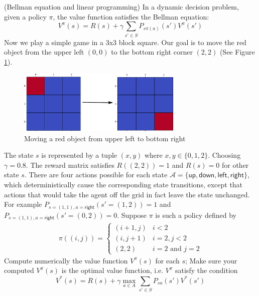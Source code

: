 \documentclass[a4paper,12pt, answers]{exam} %
\begin{document}
\begin{questions}






\question[2] (Bellman equation and linear programming)
In a dynamic decision problem, given a policy $\pi$, the value function
satisfies the Bellman equation:
\begin{equation}\label{eq:bellman}
    V^{\pi}(s)
= R(s) + \gamma
\sum_{s' \in S}
P_{s\pi(a)}(s')V^{\pi}(s')
\end{equation}
Now we play a simple game in a 3x3 block square. Our goal is to move the red object from
the upper left $(0, 0)$ to the bottom right corner $(2,2)$ (See Figure \ref{fig:my_label}).
\begin{figure}[!ht]
    \centering
    \includegraphics[width=0.7\textwidth]{Zeichnung.pdf}
    \caption{Moving a red object from upper left to bottom right}
    \label{fig:my_label}
\end{figure}
The state $s$ is represented by
a tuple $(x,y)$ where $x,y \in \{0, 1, 2\}$.
Choosing $\gamma=0.8$. The reward matrix satisfies $R((2,2))=1$ and $R(s)=0$ for other state $s$. 
There are four actions possible for each state
$\mathcal{A} = \{\textsf{up},\textsf{down},\textsf{left},\textsf{right}\}$, which deterministically cause the corresponding state transitions, except that actions that would take the agent off the grid in fact leave the state unchanged. For example $P_{s=(1,1), a=\textsf{right}}(s'=(1,2))=1$ and $P_{s=(1,1), a=\textsf{right}}(s'=(0,2))=0$.
Suppose $\pi$ is such a policy defined by
\begin{align*}
    \pi((i,j))= \begin{cases} (i+1,j) & i < 2 \\
    (i, j+1) & i = 2, j < 2 \\
    (2,2) & i=2 \textrm { and } j = 2
    \end{cases}
\end{align*}
Compute numerically the value function $V^{\pi}(s)$ for each $s$;
Make sure your computed $V^{\pi}(s)$
is the optimal value function, i.e. $V^{\pi}$ satisfy the condition
\begin{equation}
    V^*(s) = R(s) + \gamma\max_{a\in A}\sum_{s' \in S} P_{sa}(s')V^*(s')
\end{equation}


\end{questions}
\end{document}
